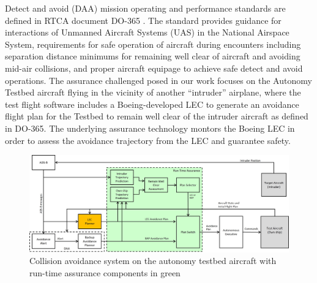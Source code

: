 Detect and avoid (DAA) mission operating and performance standards are defined in RTCA document DO-365 \cite{DO_365}.  The standard provides guidance for interactions of Unmanned Aircraft Systems (UAS) in the National Airspace System, requirements for safe operation of aircraft during encounters including separation distance minimums for remaining well clear of aircraft and avoiding mid-air collisions, and proper aircraft equipage to achieve safe detect and avoid operations.
The assurance challenged posed in our work focuses on the Autonomy Testbed aircraft flying in the vicinity of another ``intruder'' airplane, where the test flight software includes a Boeing-developed LEC to generate an avoidance flight plan for the Testbed to remain well clear of the intruder aircraft as defined in DO-365.  The underlying assurance technology montors the Boeing LEC in order to assess the avoidance trajectory from the LEC and guarantee safety. 

\begin{figure}
	\centering
	\includegraphics[width=\textwidth]{figures/rta-arch.jpg}
	\caption{Collision avoidance system on the autonomy testbed aircraft with run-time assurance components in green}
	\label{fig:rta-arch}
\end{figure}

